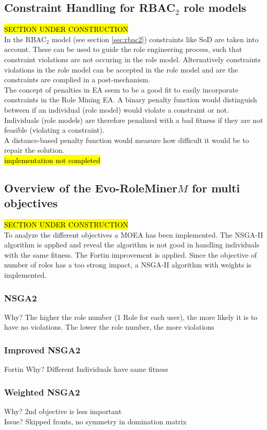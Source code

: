     \subsection{Constraint Handling for RBAC$_2$ role models}
    \hl{SECTION UNDER CONSTRUCTION}\\
    In the RBAC$_2$ model (see section \ref{sec:rbac2}) constraints like SoD are taken into account. These can be used to guide the role engineering process, such that constraint violations are not occuring in the role model. Alternatively constraints violations in the role model can be accepted in the role model and are the constraints are complied in a post-mechanism.\\
    The concept of penalties in EA seem to be a good fit to easily incorporate constraints in the Role Mining EA. A binary penalty function would distinguish between if an individual (role model) would violate a constraint or not. Individuals (role models) are therefore penalized with a bad fitness if they are not feasible (violating a constraint).\\
    A distance-based penalty function would measure how difficult it would be to repair the solution.\\
    \hl{implementation not completed}
    
    \subsection{Overview of the Evo-RoleMiner$M$ for multi objectives}
    \hl{SECTION UNDER CONSTRUCTION}\\
    To analyze the different objectives a MOEA has been implemented. The NSGA-II algorithm is applied and reveal the algorithm is not good in handling individuals with the same fitness. The Fortin improvement is applied. Since the objective of number of roles has a too strong impact, a NSGA-II algorithm with weights is implemented.
        \subsubsection{NSGA2}
        Why? The higher the role number (1 Role for each user), the more likely it is to have no violations. The lower the role number, the more violations
        \subsubsection{Improved NSGA2}
        Fortin
        Why? Different Individuals have same fitness
        \subsubsection{Weighted NSGA2}
        Why? 2nd objective is less important\\
        Issue? Skipped fronts, no symmetry in domination matrix


